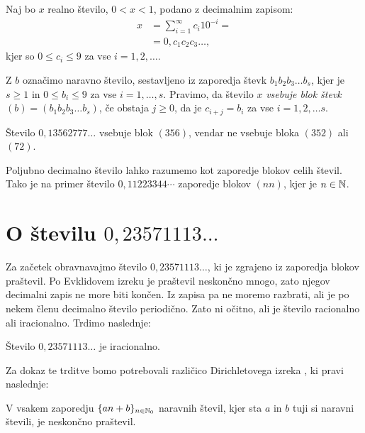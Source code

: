 \documentclass[twoside,11pt]{article}
\begin{document}
\begin{definicija}\label{defincija blokov}
    Naj bo $x$ realno število, $ 0 < x < 1$, podano z decimalnim zapisom: 
    \[ 
        \begin{split}
            x & = \sum^{\infty}_{i=1} c_i 10^{-i} = \\
            & = 0,c_1c_2c_3 \dots,
        \end{split}   
    \]
    kjer so $0 \leq c_i \leq 9$ za vse $i = 1, 2, \dots$.
    
    Z $b$ označimo naravno število, sestavljeno iz zaporedja števk
    $b_1b_2b_3 \dots b_s$, 
    kjer je $s\geq 1$ in $0 \leq b_i \leq 9$ za vse $i = 1, \dots, s$.
    Pravimo, da število $x$ {\em vsebuje blok števk $(b) = (b_1b_2b_3 \dots b_s)$}, če obstaja $j \geq 0$, da je 
    $c_{i+j} = b_i$ za vse $i=1, 2, \dots s$.
\end{definicija}

\begin{zgled}
    Število $0,13562777 \dots$ vsebuje blok $(356)$, vendar ne vsebuje bloka $(352)$ ali $(72)$.
\end{zgled}

Poljubno decimalno število lahko razumemo kot zaporedje blokov celih števil.
Tako je na primer število $0,11223344 \cdots$ zaporedje blokov $(nn)$,
kjer je $n \in \mathbb{N}$.


\section{O številu $0,23571113 \dots$}

Za začetek obravnavajmo število $0,23571113 \dots$, ki je zgrajeno iz zaporedja
blokov praštevil. 
Po Evklidovem izreku \cite{Euc} je praštevil neskončno mnogo,
zato njegov decimalni zapis ne more biti končen. 
Iz zapisa pa ne moremo razbrati, ali 
je po nekem členu decimalno število periodično. Zato ni očitno, ali je število racionalno ali iracionalno.
Trdimo naslednje:

\begin{trditev}\label{trditev praštevila}
    Število $0,23571113 \dots$ je iracionalno.
\end{trditev}

Za dokaz te trditve bomo potrebovali različico Dirichletovega izreka \cite{Vog}, ki pravi naslednje:


\begin{izrek}\label{izrek: Dirichlet}
    V vsakem zaporedju $ \lbrace an + b \rbrace_{n \in \mathbb{N}_0}$ naravnih števil, kjer sta $a$ in $b$
    tuji si naravni števili, je neskončno praštevil.
\end{izrek}
\end{document}
